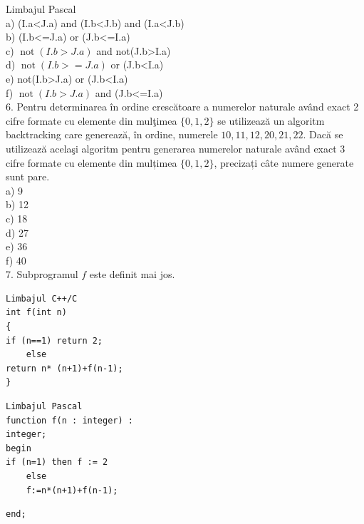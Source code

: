 \documentclass[10pt]{article}
\begin{document}
Limbajul Pascal\\
a) (I.a<J.a) and (I.b<J.b) and (I.a<J.b)\\
b) (I.b<=J.a) or (J.b<=I.a)\\
c) $\operatorname{not}(I . b>J . a)$ and not(J.b>I.a)\\
d) $\operatorname{not}(I . b>=J . a)$ or (J.b<I.a)\\
e) not(I.b>J.a) or (J.b<I.a)\\
f) $\operatorname{not}(I . b>J . a)$ and (J.b<=I.a)\\
6. Pentru determinarea în ordine crescătoare a numerelor naturale având exact 2 cifre formate cu elemente din mulţimea $\{0,1,2\}$ se utilizează un algoritm backtracking care generează, în ordine, numerele $10,11,12,20,21,22$. Dacă se utilizează acelaşi algoritm pentru generarea numerelor naturale având exact 3 cifre formate cu elemente din mulțimea $\{0,1,2\}$, precizați câte numere generate sunt pare.\\
a) 9\\
b) 12\\
c) 18\\
d) 27\\
e) 36\\
f) 40\\
7. Subprogramul $f$ este definit mai jos.

\begin{verbatim}
Limbajul C++/C
int f(int n)
{
if (n==1) return 2;
    else
return n* (n+1)+f(n-1);
}
\end{verbatim}

\begin{verbatim}
Limbajul Pascal
function f(n : integer) :
integer;
begin
if (n=1) then f := 2
    else
    f:=n*(n+1)+f(n-1);
\end{verbatim}

\begin{verbatim}
end;
\end{verbatim}
\end{document}
